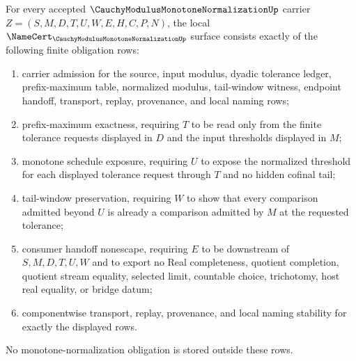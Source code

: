 \begin{theorem}
\label{thm:cauchy-modulus-monotone-normalization-namecert-obligations}
For every accepted $\CauchyModulusMonotoneNormalizationUp$ carrier $Z=(S,M,D,T,U,W,E,H,C,P,N)$, the local $\NameCert_{\CauchyModulusMonotoneNormalizationUp}$ surface consists exactly of the following finite obligation rows:
\begin{enumerate}
\item carrier admission for the source, input modulus, dyadic tolerance ledger, prefix-maximum table, normalized modulus, tail-window witness, endpoint handoff, transport, replay, provenance, and local naming rows;
\item prefix-maximum exactness, requiring $T$ to be read only from the finite tolerance requests displayed in $D$ and the input thresholds displayed in $M$;
\item monotone schedule exposure, requiring $U$ to expose the normalized threshold for each displayed tolerance request through $T$ and no hidden cofinal tail;
\item tail-window preservation, requiring $W$ to show that every comparison admitted beyond $U$ is already a comparison admitted by $M$ at the requested tolerance;
\item consumer handoff nonescape, requiring $E$ to be downstream of $S,M,D,T,U,W$ and to export no Real completeness, quotient completion, quotient stream equality, selected limit, countable choice, trichotomy, host real equality, or bridge datum;
\item componentwise transport, replay, provenance, and local naming stability for exactly the displayed rows.
\end{enumerate}
No monotone-normalization obligation is stored outside these rows.
\end{theorem}
